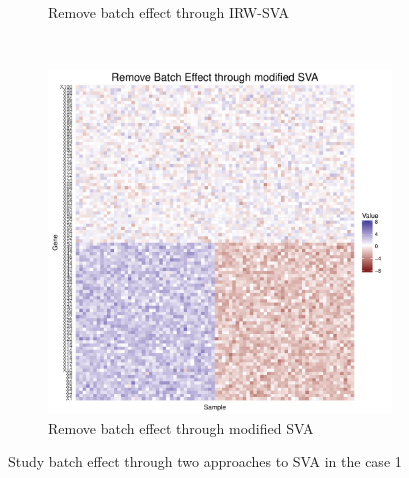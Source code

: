 \documentclass[11pt]{article}
\begin{document}
\begin{figure}[h!]
\begin{subfigure}[b]{0.3\textwidth}
        \caption{Remove batch effect through IRW-SVA}
        \label{fig:sva1}
    \end{subfigure}  %
~
    \begin{subfigure}[b]{0.3\textwidth}
        \centering
        \includegraphics[width = \textwidth]{figures/new_sva1.pdf}
        \caption{Remove batch effect through modified SVA}
        \label{fig:new_sva1}
    \end{subfigure}    
    \caption{Study batch effect through two approaches to SVA in the case 1}
    \label{fig:svas1}
\end{figure}
\end{document}

